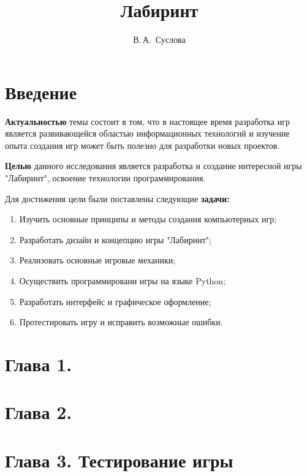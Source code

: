 \documentclass[14pt, oneside]{altsu-report}
\title{Лабиринт}
\author{В.\,А.~Суслова}
\institute{Институт цифровых технологий, электроники и физики}
\date{\the\year}
\begin{document}
\maketitle

\setcounter{page}{2}
\makeabstract
\tableofcontents

\chapter*{Введение}

\textbf{Актуальностью} темы состоит в том, что в настоящее время разработка игр является развивающейся областью информационных технологий и изучение опыта создания игр может быть полезно для разработки новых проектов.

\textbf{Целью} данного исследования является разработка и создание интересной игры "Лабиринт", освоение технологии программирования.

\par Для достижения цели были поставлены следующие \textbf{задачи:}
\begin{enumerate}
\item Изучить основные принципы и методы создания компьютерных игр;
\item Разработать дизайн и концепцию игры "Лабиринт";
\item Реализовать основные игровые механики;
\item Осуществить программировани игры на языке Python;
\item Разработать интерфейс и графическое оформление;
\item Протестировать игру и исправить возможные ошибки.
\end{enumerate}

\chapter*{Глава 1. }


\chapter*{Глава 2. }


\chapter*{Глава 3. Тестирование игры}

\end{document}
